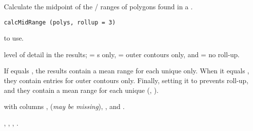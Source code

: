 \documentclass[letterpaper]{book}
\begin{document}
%
\begin{Description}\relax
Calculate the midpoint of the / ranges of polygons
found in a .
\end{Description}
%
\begin{Usage}
\begin{verbatim}
calcMidRange (polys, rollup = 3)
\end{verbatim}
\end{Usage}
%
\begin{Arguments}
\begin{ldescription}
\item[\code{polys}]  to use.
\item[\code{rollup}] level of detail in the results;  = s
only,  = outer contours only, and  = no roll-up.
\end{ldescription}
\end{Arguments}
%
\begin{Details}\relax
If  equals , the results contain a mean range for
each unique  only.  When it equals , they contain
entries for outer contours only.  Finally, setting it to 
prevents roll-up, and they contain a mean range for each unique
(, ).
\end{Details}
%
\begin{Value}
 with columns ,  (\emph{may be missing}),
, and .
\end{Value}
%
\begin{SeeAlso}\relax
{},
,
,
.
\end{SeeAlso}
%
\begin{Examples}
\end{Examples}
\end{document}
